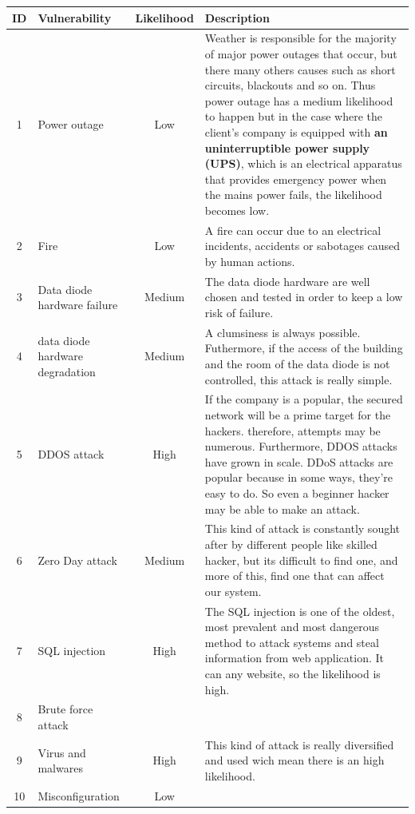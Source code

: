 \documentclass[a4paper,10pt]{article}
\begin{document}
\begin{longtable}{|c|p{}|c|p{10cm}|}
\hline
\textbf{ID}& \textbf{Vulnerability} & \textbf{Likelihood} & \textbf{Description}                 \\
\hline
1 & Power outage & Low & Weather is responsible for the majority of major power outages that occur, but there many others causes such as short circuits, blackouts and so on. Thus power outage has a medium likelihood to happen but in the case where the client's company is equipped with \textbf{an uninterruptible power supply (UPS)}, which is an electrical apparatus that provides emergency power when the mains power fails, the likelihood becomes low.    \\
\hline
2 & Fire & Low  &  A fire can occur due to an electrical incidents, accidents or sabotages caused by human actions.\\
\hline
3 & Data diode hardware failure  & Medium & The data diode hardware are well chosen and tested in order to keep a low risk of failure.\\ 
\hline
4 & data diode hardware degradation & Medium & A clumsiness is always possible. Futhermore, if the access of the building and the room of the data diode is not controlled, this attack is really simple. \\
\hline
5 & DDOS attack & High & If the company is a popular, the secured network will be a prime target for the hackers. therefore, attempts may be numerous. Furthermore, DDOS attacks have grown in scale. DDoS attacks are popular because in some ways, they're easy to do. So even a beginner hacker may be able to make an attack.\\
\hline
6 & Zero Day attack & Medium & This kind of attack is constantly sought after by different people like skilled hacker, but its difficult to find one, and more of this, find one that can affect our system. \\
\hline
7 &  SQL injection & High & The SQL injection is one of the oldest, most prevalent and most dangerous method to attack systems and steal information from web application. It can any website, so the likelihood is high.\\
\hline
8 & Brute force attack &  & \\
\hline
9 & Virus and malwares & High & This kind of attack is really diversified and used wich mean there is an high likelihood. \\
\hline
10 & Misconfiguration & Low & \\

\end{longtable}
\end{document}
